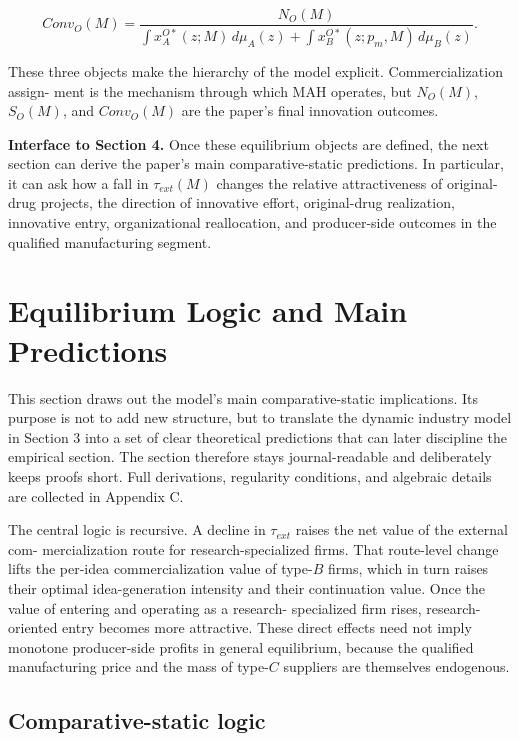 \documentclass[12pt]{article}
\begin{document}
\begin{equation}
Conv_O(M)=\frac{N_O(M)}{\int x_A^{O*}(z;M)\,d\mu_A(z)+\int x_B^{O*}(z;p_m,M)\,d\mu_B(z)}.
\end{equation}

These three objects make the hierarchy of the model explicit. Commercialization assign-
ment is the mechanism through which MAH operates, but $N_O(M)$, $S_O(M)$, and $Conv_O(M)$
are the paper's final innovation outcomes.

\textbf{Interface to Section 4.} Once these equilibrium objects are defined, the next section can
derive the paper's main comparative-static predictions. In particular, it can ask how a fall
in $\tau_{ext}(M)$ changes the relative attractiveness of original-drug projects, the direction of
innovative effort, original-drug realization, innovative entry, organizational reallocation, and
producer-side outcomes in the qualified manufacturing segment.

\section{Equilibrium Logic and Main Predictions}

This section draws out the model's main comparative-static implications. Its purpose is
not to add new structure, but to translate the dynamic industry model in Section 3 into
a set of clear theoretical predictions that can later discipline the empirical section. The
section therefore stays journal-readable and deliberately keeps proofs short. Full derivations,
regularity conditions, and algebraic details are collected in Appendix C.

The central logic is recursive. A decline in $\tau_{ext}$ raises the net value of the external com-
mercialization route for research-specialized firms. That route-level change lifts the per-idea
commercialization value of type-$B$ firms, which in turn raises their optimal idea-generation
intensity and their continuation value. Once the value of entering and operating as a research-
specialized firm rises, research-oriented entry becomes more attractive. These direct effects
need not imply monotone producer-side profits in general equilibrium, because the qualified
manufacturing price and the mass of type-$C$ suppliers are themselves endogenous.

\subsection{Comparative-static logic}
\end{document}
